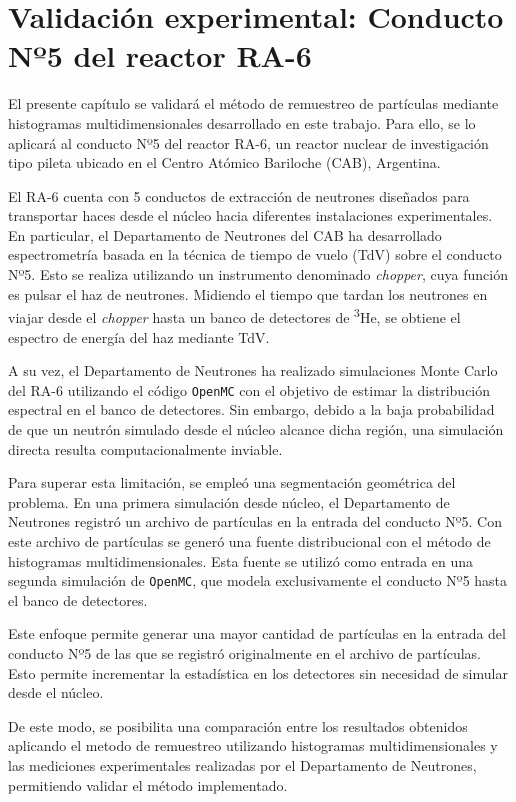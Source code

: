 \chapter{Validación experimental: Conducto Nº5 del reactor RA-6}

El presente capítulo se validará el método de remuestreo de partículas mediante histogramas multidimensionales desarrollado en este trabajo. Para ello, se lo aplicará al conducto Nº5 del reactor RA-6, un reactor nuclear de investigación tipo pileta ubicado en el Centro Atómico Bariloche (CAB), Argentina.

El RA-6 cuenta con 5 conductos de extracción de neutrones diseñados para transportar haces desde el núcleo hacia diferentes instalaciones experimentales. En particular, el Departamento de Neutrones del CAB ha desarrollado espectrometría basada en la técnica de tiempo de vuelo (TdV) sobre el conducto Nº5. Esto se realiza utilizando un instrumento denominado \textit{chopper}, cuya función es pulsar el haz de neutrones. Midiendo el tiempo que tardan los neutrones en viajar desde el \textit{chopper} hasta un banco de detectores de \textsuperscript{3}He, se obtiene el espectro de energía del haz mediante TdV.

A su vez, el Departamento de Neutrones ha realizado simulaciones Monte Carlo del RA-6 utilizando el código \texttt{OpenMC} con el objetivo de estimar la distribución espectral en el banco de detectores. Sin embargo, debido a la baja probabilidad de que un neutrón simulado desde el núcleo alcance dicha región, una simulación directa resulta computacionalmente inviable.

Para superar esta limitación, se empleó una segmentación geométrica del problema. En una primera simulación desde núcleo, el Departamento de Neutrones registró un archivo de partículas en la entrada del conducto Nº5. Con este archivo de partículas se generó una fuente distribucional con el método de histogramas multidimensionales. Esta fuente se utilizó como entrada en una segunda simulación de \texttt{OpenMC}, que modela exclusivamente el conducto Nº5 hasta el banco de detectores.

Este enfoque permite generar una mayor cantidad de partículas en la entrada del conducto Nº5 de las que se registró originalmente en el archivo de partículas. Esto permite incrementar la estadística en los detectores sin necesidad de simular desde el núcleo. 

De este modo, se posibilita una comparación entre los resultados obtenidos aplicando el metodo de remuestreo utilizando histogramas multidimensionales y las mediciones experimentales realizadas por el Departamento de Neutrones, permitiendo validar el método implementado.

